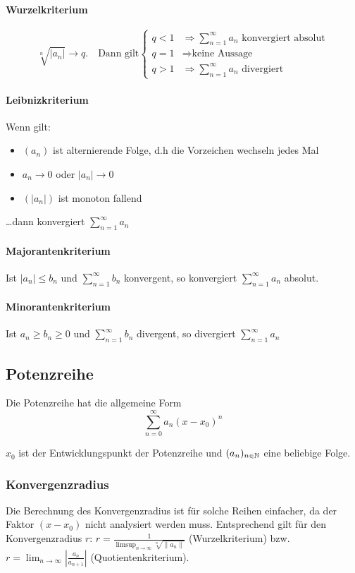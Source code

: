 \paragraph{Wurzelkriterium}
\[
\sqrt[n]{\left | a_n \right |} \to q. \quad \text{Dann gilt} \begin{cases}
q < 1 & \Rightarrow \sum_{n=1}^\infty a_n \text{ konvergiert absolut}\\
q = 1 & \Rightarrow \text{keine Aussage}\\
q > 1 & \Rightarrow \sum_{n=1}^\infty a_n \text{ divergiert}
\end{cases}
\]

\paragraph{Leibnizkriterium}
Wenn gilt:
\begin{itemize}
  \item $(a_n)$ ist alternierende Folge, d.h die Vorzeichen wechseln jedes Mal
  \item $a_n \to 0$ oder $|a_n| \to 0$
  \item $(|a_n|)$ ist monoton fallend
\end{itemize}
\ldots dann konvergiert $\sum_{n=1}^\infty a_n$

\paragraph{Majorantenkriterium}
Ist $|a_n| \leq b_n$ und $\sum_{n=1}^\infty b_n$ konvergent, so konvergiert
$\sum_{n=1}^\infty a_n$ absolut.

\paragraph{Minorantenkriterium}
Ist $a_n \geq b_n \geq 0$ und $\sum_{n=1}^\infty b_n$ divergent, so divergiert
$\sum_{n=1}^\infty a_n$

\subsection{Potenzreihe}
Die Potenzreihe hat die allgemeine Form
\[
\sum_{n=0}^\infty a_n (x - x_0)^n
\]

$x_0$ ist der Entwicklungspunkt der Potenzreihe und $(a_n)_{n \in \mathbb{N}}$ eine
beliebige Folge.

\subsubsection{Konvergenzradius}
Die Berechnung des Konvergenzradius ist für solche Reihen einfacher, da der
Faktor $(x - x_0)$ nicht analysiert werden muss. Entsprechend gilt für den
Konvergenzradius $r$:
$r = \frac{1}{\limsup_{n\to\infty} \sqrt[n]{\|a_n\|}}$ (Wurzelkriterium) bzw.
$r = \lim_{n\to\infty} \left | \frac{a_n}{a_{n+1}} \right |$
(Quotientenkriterium).
